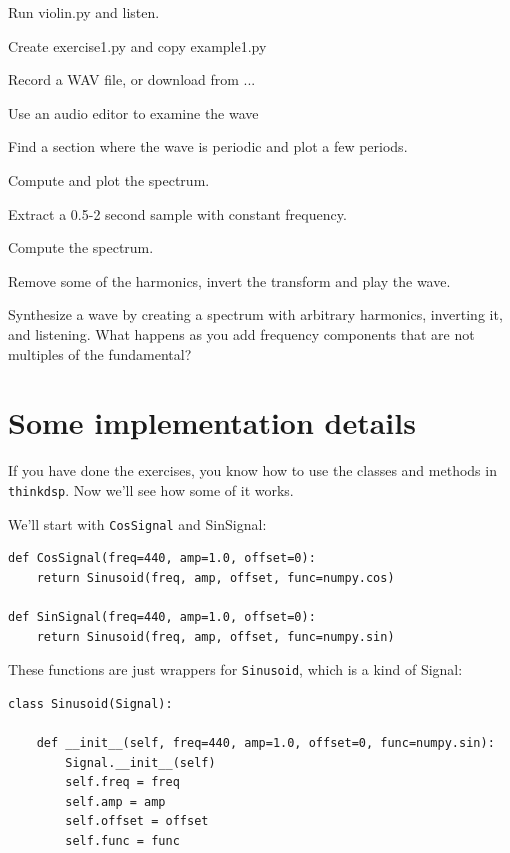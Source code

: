 \documentclass[12pt]{book}
\begin{document}
\begin{exercise}
Run violin.py and listen.
\end{exercise}

\begin{exercise}
Create exercise1.py and copy example1.py

Record a WAV file, or download from ...

Use an audio editor to examine the wave

Find a section where the wave is periodic and plot a few periods.

Compute and plot the spectrum.
\end{exercise}

\begin{exercise}
Extract a 0.5-2 second sample with constant frequency.

Compute the spectrum.

Remove some of the harmonics, invert the transform and play the wave.
\end{exercise}

\begin{exercise}
Synthesize a wave by creating a spectrum with arbitrary harmonics,
inverting it, and listening.  What happens as you add frequency
components that are not multiples of the fundamental?
\end{exercise}


\section{Some implementation details}

If you have done the exercises, you know how to use the
classes and methods in {\tt thinkdsp}.  Now we'll see how
some of it works.

We'll start with {\tt CosSignal} and {SinSignal}:

\begin{verbatim}
def CosSignal(freq=440, amp=1.0, offset=0):
    return Sinusoid(freq, amp, offset, func=numpy.cos)

def SinSignal(freq=440, amp=1.0, offset=0):
    return Sinusoid(freq, amp, offset, func=numpy.sin)
\end{verbatim}

These functions are just wrappers for {\tt Sinusoid}, which
is a kind of Signal:

\begin{verbatim}
class Sinusoid(Signal):
    
    def __init__(self, freq=440, amp=1.0, offset=0, func=numpy.sin):
        Signal.__init__(self)
        self.freq = freq
        self.amp = amp
        self.offset = offset
        self.func = func
\end{verbatim}
\end{document}
